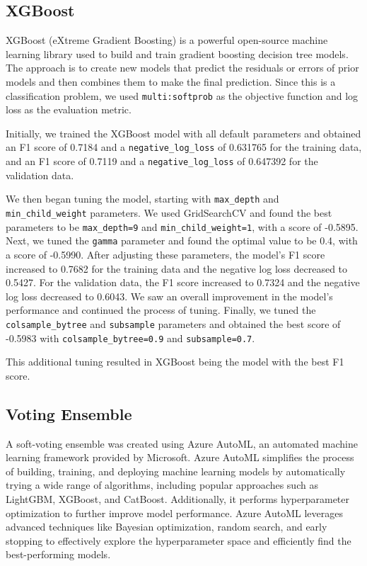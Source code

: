 \documentclass{article}
\begin{document}
\subsection{XGBoost}

XGBoost (eXtreme Gradient Boosting) is a powerful open-source machine learning library used to build and train gradient boosting decision tree models. The approach is to create new models that predict the residuals or errors of prior models and then combines them to make the final prediction.
Since this is a classification problem, we used \texttt{multi:softprob} as the objective function and log loss as the evaluation metric.

Initially, we trained the XGBoost model with all default parameters and obtained an F1 score of 0.7184 and a \texttt{negative\_log\_loss} of 0.631765 for the training data, and an F1 score of 0.7119 and a \texttt{negative\_log\_loss} of 0.647392 for the validation data. 

We then began tuning the model, starting with \texttt{max\_depth} and \texttt{min\_child\_weight} parameters.
We used GridSearchCV and found the best parameters to be \texttt{max\_depth=9} and \texttt{min\_child\_weight=1}, with a score of -0.5895.
Next, we tuned the \texttt{gamma} parameter and found the optimal value to be 0.4, with a score of -0.5990.
After adjusting these parameters, the model's F1 score increased to 0.7682 for the training data and the negative log loss decreased to 0.5427.
For the validation data, the F1 score increased to 0.7324 and the negative log loss decreased to 0.6043.
We saw an overall improvement in the model's performance and continued the process of tuning.
Finally, we tuned the \texttt{colsample\_bytree} and \texttt{subsample} parameters and obtained the best score of -0.5983 with \texttt{colsample\_bytree=0.9} and \texttt{subsample=0.7}.

This additional tuning resulted in XGBoost being the model with the best F1 score.

\subsection{Voting Ensemble}

A soft-voting ensemble was created using Azure AutoML, an automated machine learning framework provided by Microsoft.
Azure AutoML simplifies the process of building, training, and deploying machine learning models by automatically trying a wide range of algorithms, including popular approaches such as LightGBM, XGBoost, and CatBoost.
Additionally, it performs hyperparameter optimization to further improve model performance.
Azure AutoML leverages advanced techniques like Bayesian optimization, random search, and early stopping to effectively explore the hyperparameter space and efficiently find the best-performing models.
\end{document}
